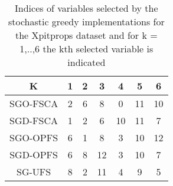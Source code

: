 \begin{table}
	\begin{center}
		\begin{tabular}{c c c c c c c}
			K & 1 & 2 & 3 & 4 & 5 & 6 \\
			\hline
			SGO-FSCA & 2 & 6 & 8 & 0 & 11 & 10 \\
			SGD-FSCA & 1 & 2 & 6 & 10 & 11 & 7 \\
			SGO-OPFS & 6 & 1 & 8 & 3 & 10 & 12 \\
			SGD-OPFS & 6 & 8 & 12 & 3 & 10 & 7 \\
			SG-UFS & 8 & 2 & 11 & 4 & 9 & 5 \\
		\end{tabular}
	\end{center}
	\caption{Indices of variables selected by the stochastic greedy implementations for the Xpitprops dataset and for k = 1,..,6 the kth selected variable is indicated}
\end{table}
